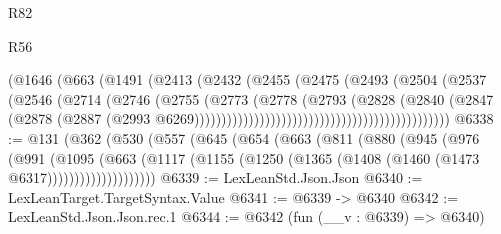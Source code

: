 \begin{lexlean}{R82}
\begin{lexlean}{R56}
\begin{coremodule}
{{{{{{{{{{{{{{{{{{{{{{{{{{{{{{{{{{{{{{{{{{{{{{{{{{{{{{{{{{{{{{{{{{{{{{{{{{{{{{{{{{{{{{{{{{{{{{{{{{{{{{{{{{{{{{{{{{{{{{{{{{{{{{{{{{{{{{{{{{{{{{{{{{{{{{{{{{{{{{{{{{{{{{{{{{{{{{{{{{{{{{{{{{{{{{{{{{{{{{{{{{{{{{{{{{{                                                    (@1646
                                                      (@663
                                                        (@1491
                                                          (@2413
                                                            (@2432
                                                              (@2455
                                                                (@2475
                                                                  (@2493
                                                                    (@2504
                                                                      (@2537
                                                                        (@2546
                                                                          (@2714
                                                                            (@2746
                                                                              (@2755
                                                                                (@2773
                                                                                  (@2778
                                                                                    (@2793
                                                                                      (@2828
                                                                                        (@2840
                                                                                          (@2847
                                                                                            (@2878
                                                                                              (@2887
                                                                                                (@2993
                                                                                                  @6269)))))))))))))))))))))))))))))))))))))))))))))))
@6338 := @131
    (@362
      (@530
        (@557
          (@645
            (@654
              (@663
                (@811
                  (@880
                    (@945
                      (@976
                        (@991
                          (@1095
                            (@663
                              (@1117
                                (@1155 (@1250 (@1365 (@1408 (@1460 (@1473 @6317))))))))))))))))))))
@6339 := LexLeanStd.Json.Json
@6340 := LexLeanTarget.TargetSyntax.Value
@6341 := @6339 -> @6340
@6342 := LexLeanStd.Json.Json.rec.{1}
@6344 := @6342 (fun (__v : @6339) => @6340)
}}}}}}}}}}}}}}}}}}}}}}}}}}}}}}}}}}}}}}}}}}}}}}}}}}}}}}}}}}}}}}}}}}}}}}}}}}}}}}}}}}}}}}}}}}}}}}}}}}}}}}}}}}}}}}}}}}}}}}}}}}}}}}}}}}}}}}}}}}}}}}}}}}}}}}}}}}}}}}}}}}}}}}}}}}}}}}}}}}}}}}}}}}}}}}}}}}}}}}}}}}}}}}}}}}}
\end{coremodule}
\end{lexlean}
\end{lexlean}
